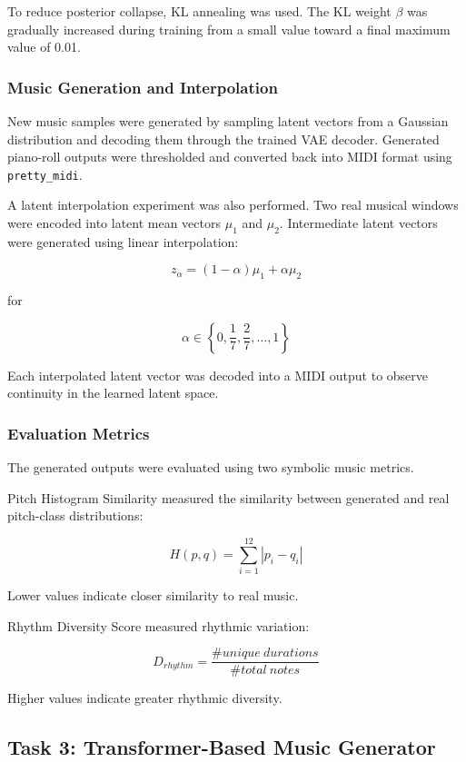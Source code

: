 \documentclass{article}
\theoremstyle{plain}
\theoremstyle{definition}
\theoremstyle{remark}
\begin{document}
To reduce posterior collapse, KL annealing was used. The KL weight $\beta$ was gradually increased during training from a small value toward a final maximum value of 0.01.

\subsubsection{Music Generation and Interpolation}

New music samples were generated by sampling latent vectors from a Gaussian distribution and decoding them through the trained VAE decoder. Generated piano-roll outputs were thresholded and converted back into MIDI format using \texttt{pretty\_midi}.

A latent interpolation experiment was also performed. Two real musical windows were encoded into latent mean vectors $\mu_1$ and $\mu_2$. Intermediate latent vectors were generated using linear interpolation:

\[
z_\alpha = (1 - \alpha)\mu_1 + \alpha \mu_2
\]

for

\[
\alpha \in
\left\{
0,
\frac{1}{7},
\frac{2}{7},
\dots,
1
\right\}
\]

Each interpolated latent vector was decoded into a MIDI output to observe continuity in the learned latent space.

\subsubsection{Evaluation Metrics}

The generated outputs were evaluated using two symbolic music metrics.

Pitch Histogram Similarity measured the similarity between generated and real pitch-class distributions:

\[
H(p,q) =
\sum_{i=1}^{12}
|p_i - q_i|
\]

Lower values indicate closer similarity to real music.

Rhythm Diversity Score measured rhythmic variation:

\[
D_{rhythm} =
\frac{\# unique\ durations}
{\# total\ notes}
\]

Higher values indicate greater rhythmic diversity.

\subsection{Task 3: Transformer-Based Music Generator}
\end{document}
